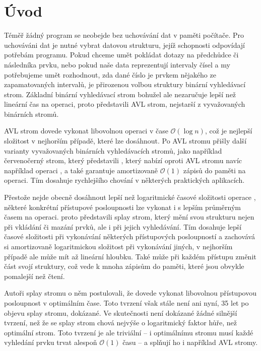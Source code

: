 \chapter*{Úvod}

Téměř žádný program se neobejde bez uchovávání dat v paměti počítače. Pro uchováváni dat je nutné vybrat datovou strukturu, jejíž schopnosti odpovídají potřebám programu. Pokud chceme umět pokládat dotazy na předchůdce či následníka prvku, nebo pokud naše data reprezentují intervaly čísel a my potřebujeme umět rozhodnout, zda dané číslo je prvkem nějakého ze zapamatovaných intervalů, je přirozenou volbou struktury binární vyhledávací strom. Základní binární vyhledávací strom bohužel ale nezaručuje lepší než lineární čas na operaci, proto \citet{AVL} představili AVL strom, nejstarší z vyvažovaných binárních stromů.

AVL strom dovede vykonat libovolnou operaci v čase $\mathcal O(\log n)$, což je nejlepší složitost v nejhorším případě, které lze dosáhnout. Po AVL stromu přišly další varianty vyvažovaných binárních vyhledávacích stromů, jako například červenočerný strom, který představili \citet{redblack}, který nabízí oproti AVL stromu navíc například operaci , a také garantuje amortizovaně $\mathcal O(1)$ zápisů do paměti na operaci. Tím dosahuje rychlejšího chování v některých praktických aplikacích. 

Přestože nejde obecně dosáhnout lepší než logaritmické časové složitosti operace , některé konkrétní přístupové posloupnosti lze vykonat i s lepším průměrným časem na operaci. \citet{splay} proto představili splay strom, který mění svou strukturu nejen při vkládání či mazání prvků, ale i při jejich vyhledávání. Tím dosahuje lepší časové složitosti při vykonávání některých přístupových posloupností a zachovává si amortizovaně logaritmickou složitost při vykonávání jiných, v nejhorším případě ale může mít až lineární hloubku. Také může při každém přístupu změnit část svojí struktury, což vede k mnoha zápisům do paměti, které jsou obvykle pomalejší než čtení.

Autoři splay stromu o něm postulovali, že dovede vykonat libovolnou přístupovou posloupnost v optimálním čase. Toto tvrzení však stále není ani nyní, 35 let po objevu splay stromu, dokázané. Ve skutečnosti není dokázané žádné silnější tvrzení, než že se splay strom chová nejvýše o logaritmický faktor hůře, než optimální strom. Toto tvrzení je ale triviální -- i optimálnímu stromu musí každé vyhledání prvku trvat alespoň $\mathcal O(1)$ času -- a splňují ho i například AVL stromy.

